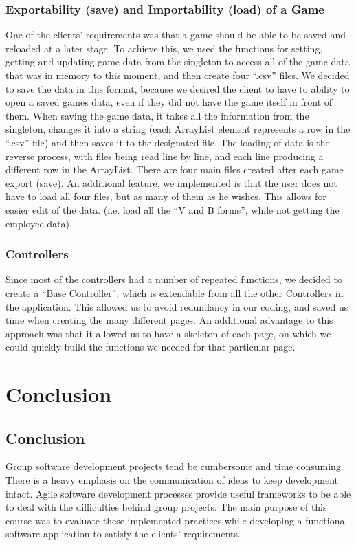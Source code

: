 \documentclass{l3proj}
\begin{document}
\subsubsection{Exportability (save) and Importability (load) of a Game}
One of the clients’ requirements was that a game should be able to be saved and reloaded at a later stage. To achieve this, we used the functions for setting, getting and updating game data from the singleton to access all of the game data that was in memory to this moment, and then create four “.csv” files. We decided to save the data in this format, because we desired the client to have to ability to open a saved games data, even if they did not have the game itself in front of them. 
When saving the game data, it takes all the information from the singleton, changes it into a string (each ArrayList element represents a row in the “.csv” file) and then saves it to the designated file. The loading of data is the reverse process, with files being read line by line, and each line producing a different row in the ArrayList. There are four main files created after each game export (save). An additional feature, we implemented is that the user does not have to load all four files, but as many of them as he wishes. This allows for easier edit of the data. (i.e. load all the “V and B forms”, while not getting the employee data).

\subsubsection{Controllers}
Since most of the controllers had a number of repeated functions, we decided to create a “Base Controller”, which is extendable from all the other Controllers in the application. This allowed us to avoid redundancy in our coding, and saved us time when creating the many different pages. An additional advantage to this approach was that it allowed us to have a skeleton of each page, on which we could quickly build the functions we needed for that particular page.

\section{Conclusion}
\label{sec:conclusion}
\subsection{Conclusion}
Group software development projects tend be cumbersome and time consuming. There is a heavy emphasis on the communication of ideas to keep development intact. Agile software development processes provide useful frameworks to be able to deal with the difficulties behind group projects. The main purpose of this course was to evaluate these implemented practices while developing a functional software application to satisfy the clients’ requirements.
\end{document}
